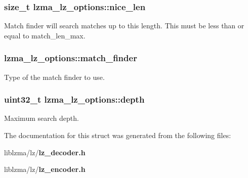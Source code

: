 \subsubsection[{nice\-\_\-len}]{\setlength{\rightskip}{0pt plus 5cm}size\-\_\-t lzma\-\_\-lz\-\_\-options\-::nice\-\_\-len}\label{structlzma__lz__options_a932c109d9bc04a2abfd710b67fd65fba}
Match finder will search matches up to this length. This must be less than or equal to match\-\_\-len\-\_\-max. 
\subsubsection[{match\-\_\-finder}]{ lzma\-\_\-lz\-\_\-options\-::match\-\_\-finder}\label{structlzma__lz__options_ae68aa09d8094a22ae382a0bcf41a24d6}


Type of the match finder to use. 

\subsubsection[{depth}]{\setlength{\rightskip}{0pt plus 5cm}uint32\-\_\-t lzma\-\_\-lz\-\_\-options\-::depth}\label{structlzma__lz__options_a65f36545a297e0ecf4906528453ccc4a}


Maximum search depth. 



The documentation for this struct was generated from the following files\-:\begin{DoxyCompactItemize}
\item 
liblzma/lz/{\bf lz\-\_\-decoder.\-h}\item 
liblzma/lz/{\bf lz\-\_\-encoder.\-h}\end{DoxyCompactItemize}
